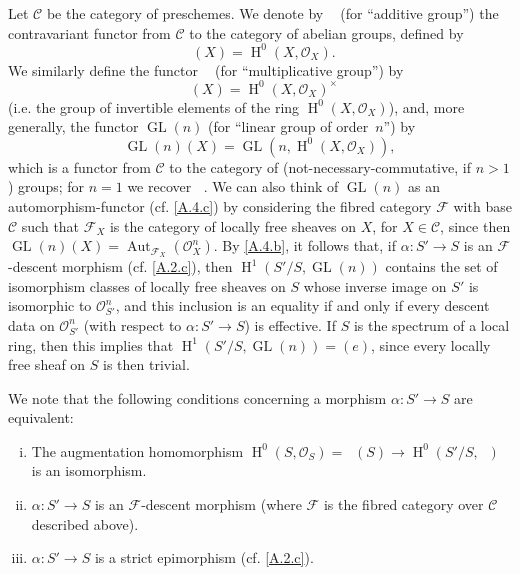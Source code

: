 \documentclass{article}
\theoremstyle{plain}
\theoremstyle{definition}
\newenvironment{example}[1]
  {\renewcommand\theinnercustomexample{#1}\innercustomexample}
  {\endinnercustomexample}
\newcommand{\sh}[1]{{\mathscr{#1}}}
\newcommand{\cat}[1]{{\mathcal{#1}}}
\DeclareMathOperator{\Aut}{Aut}
\DeclareMathOperator{\HH}{H}
\DeclareMathOperator{\GL}{GL}
\DeclareMathOperator{\Ga}{G_a}
\DeclareMathOperator{\Gm}{G_m}
\newcommand{\oldpage}[1]{\marginpar{\footnotesize$\Big\vert$ \textit{p.~#1}}}
\begin{document}
\subsubsection{}
\label{A.4.e}

\begin{example}{2}
  Let $\cat{C}$ be the category of preschemes.
  We denote by $\Ga$ (for ``additive group'') the contravariant functor from $\cat{C}$ to the category of abelian groups, defined by
  \[
    \Ga(X) = \HH^0(X,\sh{O}_X).
  \]
  We similarly define the functor $\Gm$ (for ``multiplicative group'') by
  \[
    \Gm(X) = \HH^0(X,\sh{O}_X)^\times
  \]
  (i.e. the group of invertible elements of the ring $\HH^0(X,\sh{O}_X)$), and, more generally, the functor $\GL(n)$ (for ``linear group of order~$n$'') by
\oldpage{190-15}
  \[
    \GL(n)(X) = \GL(n,\HH^0(X,\sh{O}_X)),
  \]
  which is a functor from $\cat{C}$ to the category of (not-necessary-commutative, if $n>1$) groups;
  for $n=1$ we recover $\Gm$.
  We can also think of $\GL(n)$ as an automorphism-functor (cf. \cref{A.4.c}) by considering the fibred category $\sh{F}$ with base $\cat{C}$ such that $\sh{F}_X$ is the category of locally free sheaves on $X$, for $X\in\cat{C}$, since then $\GL(n)(X)=\Aut_{\sh{F}_X}(\sh{O}_X^n)$.
  By \cref{A.4.b}, it follows that, if $\alpha\colon S'\to S$ is an $\sh{F}$-descent morphism (cf. \cref{A.2.c}), then $\HH^1(S'/S,\GL(n))$ contains the set of isomorphism classes of locally free sheaves on $S$ whose inverse image on $S'$ is isomorphic to $\sh{O}_{S'}^n$, and this inclusion is an equality if and only if every descent data on $\sh{O}_{S'}^n$ (with respect to $\alpha\colon S'\to S$) is effective.
  If $S$ is the spectrum of a local ring, then this implies that $\HH^1(S'/S,\GL(n))=(e)$, since every locally free sheaf on $S$ is then trivial.

  We note that the following conditions concerning a morphism $\alpha\colon S'\to S$ are equivalent:
  \begin{enumerate}[(i)]
    \item The augmentation homomorphism $\HH^0(S,\sh{O}_S) = \Ga(S)\to\HH^0(S'/S,\Ga)$ is an isomorphism.
    \item $\alpha\colon S'\to S$ is an $\sh{F}$-descent morphism (where $\sh{F}$ is the fibred category over $\cat{C}$ described above).
    \item $\alpha\colon S'\to S$ is a strict epimorphism (cf. \cref{A.2.c}).
  \end{enumerate}


\end{example}
\end{document}
